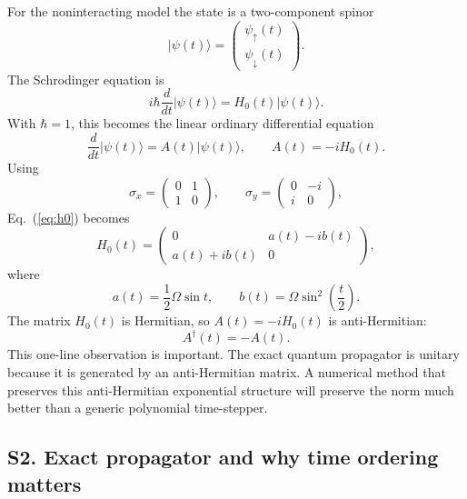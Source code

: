 \documentclass[aps,pra,preprint,superscriptaddress,nofootinbib]{revtex4-2}
\begin{document}
For the noninteracting model the state is a two-component spinor
\begin{equation}
|\psi(t)\rangle =
\begin{pmatrix}
\psi_\uparrow(t)\\
\psi_\downarrow(t)
\end{pmatrix}.
\end{equation}
The Schrodinger equation is
\begin{equation}
i\hbar \frac{d}{dt}|\psi(t)\rangle=H_0(t)|\psi(t)\rangle.
\end{equation}
With \(\hbar=1\), this becomes the linear ordinary differential equation
\begin{equation}
\frac{d}{dt}|\psi(t)\rangle=A(t)|\psi(t)\rangle,\qquad
A(t)=-iH_0(t).
\label{eq:s1-ode}
\end{equation}
Using
\begin{equation}
\sigma_x=
\begin{pmatrix}
0&1\\
1&0
\end{pmatrix},\qquad
\sigma_y=
\begin{pmatrix}
0&-i\\
i&0
\end{pmatrix},
\end{equation}
Eq.~(\ref{eq:h0}) becomes
\begin{equation}
H_0(t)=
\begin{pmatrix}
0 & a(t)-ib(t)\\
a(t)+ib(t) & 0
\end{pmatrix},
\end{equation}
where
\begin{equation}
a(t)=\frac{1}{2}\Omega\sin t,\qquad
b(t)=\Omega\sin^2\left(\frac{t}{2}\right).
\end{equation}
The matrix \(H_0(t)\) is Hermitian, so \(A(t)=-iH_0(t)\) is anti-Hermitian:
\begin{equation}
A^\dagger(t)=-A(t).
\end{equation}
This one-line observation is important. The exact quantum propagator is unitary because it is generated by an anti-Hermitian matrix. A numerical method that preserves this anti-Hermitian exponential structure will preserve the norm much better than a generic polynomial time-stepper.

\subsection*{S2. Exact propagator and why time ordering matters}
\end{document}
